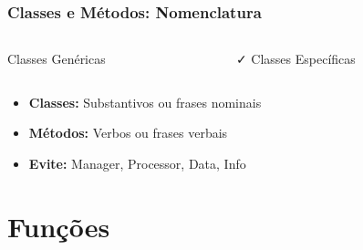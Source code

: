 \documentclass[aspectratio=169]{beamer}
\begin{document}
\begin{frame}
\frametitle{Classes e Métodos: Nomenclatura}

\begin{columns}
\begin{column}{0.5\textwidth}
\begin{block}{\textcolor{cleanred}{\faTimes} Classes Genéricas}
\scriptsize

\end{block}
\end{column}

\begin{column}{0.5\textwidth}
\begin{block}{\textcolor{cleangreen}{\faCheck} Classes Específicas}
\scriptsize

\end{block}
\end{column}
\end{columns}

\vspace{0.3cm}
\footnotesize
\begin{itemize}
    \item \textbf{Classes:} Substantivos ou frases nominais
    \item \textbf{Métodos:} Verbos ou frases verbais
    \item \textbf{Evite:} Manager, Processor, Data, Info
\end{itemize}
\end{frame}

\section{Funções}
\end{document}
